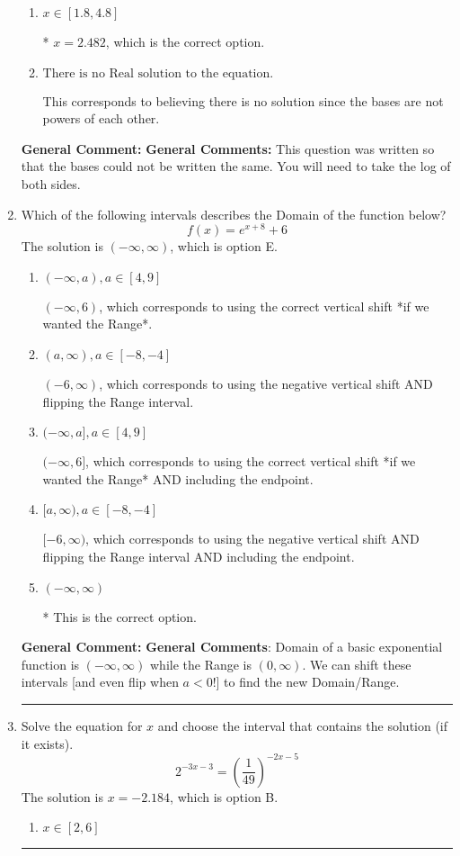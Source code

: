 \documentclass{extbook}[14pt]
\newcommand{\litem}[1]{\item #1

\rule{\textwidth}{0.4pt}}
\begin{document}
\begin{enumerate}
{\begin{enumerate}[label=\Alph*.]
$x = -2.450$, which corresponds to distributing the $\ln(base)$ to the second term of the exponent only.
\item \( x \in [1.8, 4.8] \)

* $x = 2.482$, which is the correct option.
\item \( \text{There is no Real solution to the equation.} \)

This corresponds to believing there is no solution since the bases are not powers of each other.
\end{enumerate}

\textbf{General Comment:} \textbf{General Comments:} This question was written so that the bases could not be written the same. You will need to take the log of both sides.
}
\litem{
Which of the following intervals describes the Domain of the function below?
\[ f(x) = e^{x+8}+6 \]The solution is \( (-\infty, \infty) \), which is option E.\begin{enumerate}[label=\Alph*.]
\item \( (-\infty, a), a \in [4, 9] \)

$(-\infty, 6)$, which corresponds to using the correct vertical shift *if we wanted the Range*.
\item \( (a, \infty), a \in [-8, -4] \)

$(-6, \infty)$, which corresponds to using the negative vertical shift AND flipping the Range interval.
\item \( (-\infty, a], a \in [4, 9] \)

$(-\infty, 6]$, which corresponds to using the correct vertical shift *if we wanted the Range* AND including the endpoint.
\item \( [a, \infty), a \in [-8, -4] \)

$[-6, \infty)$, which corresponds to using the negative vertical shift AND flipping the Range interval AND including the endpoint.
\item \( (-\infty, \infty) \)

* This is the correct option.
\end{enumerate}

\textbf{General Comment:} \textbf{General Comments}: Domain of a basic exponential function is $(-\infty, \infty)$ while the Range is $(0, \infty)$. We can shift these intervals [and even flip when $a<0$!] to find the new Domain/Range.
}
\litem{
Solve the equation for $x$ and choose the interval that contains the solution (if it exists).
\[ 2^{-3x-3} = \left(\frac{1}{49}\right)^{-2x-5} \]The solution is \( x = -2.184 \), which is option B.\begin{enumerate}[label=\Alph*.]
\item \( x \in [2, 6] \)


\end{enumerate}}
\end{enumerate}
\end{document}
